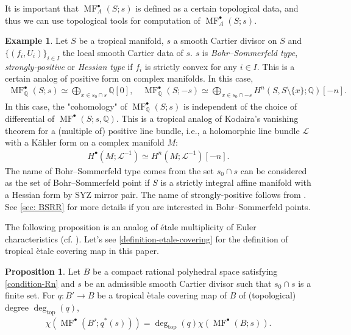 \documentclass[a4paper,dvipdfmx,reqno,12pt]{amsart}
\theoremstyle{definition}
\newtheorem{example}[theorem]{Example}
\newtheorem{proposition}[theorem]{Proposition}
\newcommand{\Q}{\mathbb{Q}}%
\newcommand{\mcal}[1]{\mathcal{#1}}%
\newcommand{\opn}[1]{\operatorname{#1}}
\numberwithin{equation}{section}
\begin{document}
It is important that $\opn{MF}^{\bullet}_{A}(S;s)$ is
defined as a certain topological data, and thus
we can use topological tools for computation of 
$\opn{MF}^{\bullet}_{A}(S;s)$.

\begin{example}
\label{example-tropical-kodaira-vanishing}
Let $S$ be a tropical manifold, 
$s$ a smooth Cartier divisor on $S$ 
and $\{(f_i,U_i)\}_{i\in I}$ the local smooth 
Cartier data of $s$. 
$s$ is 
\emph{Bohr--Sommerfeld type},
\emph{strongly-positive}
or \emph{Hessian type} if
$f_i$ is strictly convex for any $i\in I$. 
This is a certain analog of positive form on
complex manifolds. In this case, 
\begin{align}
\opn{MF}^{\bullet}_{\mathbb{Q}}(S;s)\simeq 
\bigoplus_{x\in s_0 \cap s} \Q[0], \quad
\opn{MF}^{\bullet}_{\mathbb{Q}}(S;-s)\simeq 
\bigoplus_{x\in s_0\cap -s} 
H^{n}(S,S\setminus\{x\};\mathbb{Q})[-n].
\end{align}
In this case, the "cohomology" of 
$\opn{MF}^{\bullet}_{\mathbb{Q}}(S;s)$ is independent of the choice of 
differential of $\opn{MF}^{\bullet}(S;s,\Q)$.
This is a tropical analog of Kodaira's vanishing theorem
for a (multiple of) positive line bundle, i.e., a holomorphic line bundle $\mcal{L}$ with a 
K\"ahler form on a complex manifold $M$: 
\begin{align}
H^{\bullet}(M;\mcal{L}^{-1})\simeq H^{n}(M;\mcal{L}^{-1})[-n].
\end{align}
The name of Bohr--Sommerfeld type comes from 
the set $s_0\cap s$ can be considered as the set of 
Bohr--Sommerfeld point if $S$ is a strictly integral affine manifold 
with a Hessian form by SYZ mirror pair.
The name of strongly-positive follows 
from \cite{MR2892935}.
See \cref{sec: BSRR} for more details if 
you are interested in Bohr--Sommerfeld points.
\end{example}

The following proposition is an analog of \'{e}tale multiplicity of Euler characteristics
(cf. \cite[Proposition 1.1.28]{MR2095471}).
Let's see \cref{definition-etale-covering} for 
the definition of tropical \`etale covering 
map in this paper.
\begin{proposition}
\label{proposition-euler-number-etale}
Let $B$ be a compact rational polyhedral space satisfying
\cref{condition-Rn} and $s$ be an admissible smooth Cartier divisor
such that $s_0\cap s$ is a finite set.
For $q \colon B' \to B$ be a tropical \`etale covering 
map of $B$ of 
(topological) degree 
$\opn{deg}_{\opn{top}}(q)$,
\begin{align}
\chi(\opn{MF}^{\bullet}(B';q^{*}(s)))=
\opn{deg}_{\opn{top}}(q)\chi(\opn{MF}^{\bullet}(B;s)).
\end{align}
\end{proposition}
\end{document}
